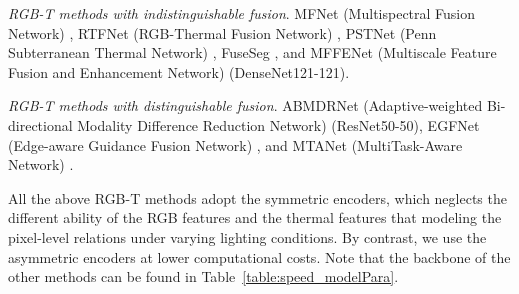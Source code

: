 \documentclass[10.5pt,twocolumn,journal,letterpaper]{IEEEtran}
\begin{document}
\textit{RGB-T methods with indistinguishable fusion}. MFNet (Multispectral Fusion Network) \cite{ha-iros2017-mfnet}, RTFNet (RGB-Thermal Fusion Network) \cite{sun-ral2019-rtfnet}, PSTNet (Penn Subterranean Thermal Network) \cite{shivakumar-icra2020-pst900}, FuseSeg \cite{sun-tase2021-fuseseg}, and MFFENet (Multiscale Feature Fusion and Enhancement Network) \cite{huang-cvpr2017-densenet} (DenseNet121-121). 

\textit{RGB-T methods with distinguishable fusion}. ABMDRNet (Adaptive-weighted Bi-directional Modality Difference Reduction Network) \cite{zhang-cvpr2021-abmdrnet} (ResNet50-50), EGFNet (Edge-aware Guidance Fusion Network) \cite{zhou-aaai2022-egfnet}, and MTANet (MultiTask-Aware Network) \cite{zhou-tiv2022-mtanet}. 

All the above RGB-T methods adopt the symmetric encoders, which neglects the different ability of the RGB features and the thermal features that modeling the pixel-level relations under varying lighting conditions. By contrast, we use the asymmetric encoders at lower computational costs. Note that the backbone of the other methods can be found in Table~\ref{table:speed_modelPara}.
\end{document}
